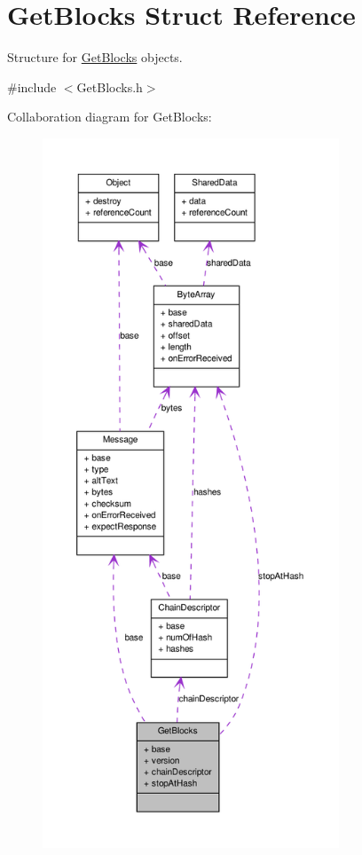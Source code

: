 \hypertarget{struct_get_blocks}{
\section{GetBlocks Struct Reference}
\label{struct_get_blocks}
}


Structure for \hyperlink{struct_get_blocks}{GetBlocks} objects.  




{\ttfamily \#include $<$GetBlocks.h$>$}



Collaboration diagram for GetBlocks:
\nopagebreak
\begin{figure}[H]
\begin{center}
\leavevmode
\includegraphics[height=600pt]{struct_get_blocks__coll__graph}
\end{center}
\end{figure}
